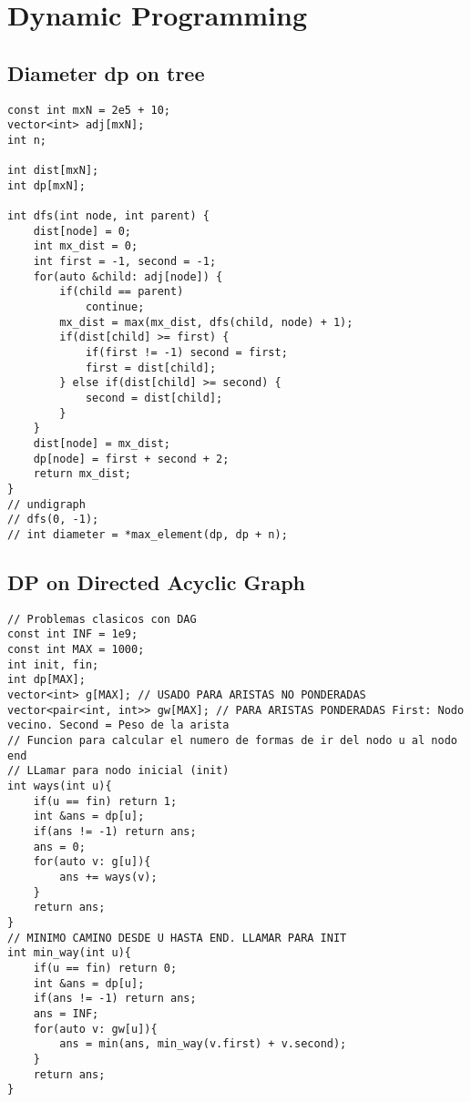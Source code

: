 \documentclass[10pt,letterpaper,twocolumn,twosided]{article}
\begin{document}
\section{Dynamic Programming}

\subsection{Diameter dp on tree}
\begin{lstlisting}
const int mxN = 2e5 + 10;
vector<int> adj[mxN];
int n;
 
int dist[mxN];
int dp[mxN];
 
int dfs(int node, int parent) {
    dist[node] = 0;
    int mx_dist = 0;
    int first = -1, second = -1;
    for(auto &child: adj[node]) {
        if(child == parent)
            continue;
        mx_dist = max(mx_dist, dfs(child, node) + 1);
        if(dist[child] >= first) {
            if(first != -1) second = first;
            first = dist[child];
        } else if(dist[child] >= second) {
            second = dist[child];
        }
    }
    dist[node] = mx_dist;
    dp[node] = first + second + 2;
    return mx_dist;
}
// undigraph
// dfs(0, -1);
// int diameter = *max_element(dp, dp + n);
\end{lstlisting}

\subsection{DP on Directed Acyclic Graph}
\begin{lstlisting}
// Problemas clasicos con DAG
const int INF = 1e9;
const int MAX = 1000;
int init, fin;
int dp[MAX];
vector<int> g[MAX]; // USADO PARA ARISTAS NO PONDERADAS
vector<pair<int, int>> gw[MAX]; // PARA ARISTAS PONDERADAS First: Nodo vecino. Second = Peso de la arista
// Funcion para calcular el numero de formas de ir del nodo u al nodo end
// LLamar para nodo inicial (init)
int ways(int u){
    if(u == fin) return 1;
    int &ans = dp[u];
    if(ans != -1) return ans;
    ans = 0;
    for(auto v: g[u]){
        ans += ways(v);
    }
    return ans;
}
// MINIMO CAMINO DESDE U HASTA END. LLAMAR PARA INIT
int min_way(int u){
    if(u == fin) return 0;
    int &ans = dp[u];
    if(ans != -1) return ans;
    ans = INF;
    for(auto v: gw[u]){
        ans = min(ans, min_way(v.first) + v.second);
    }
    return ans;
}
\end{lstlisting}
\end{document}
